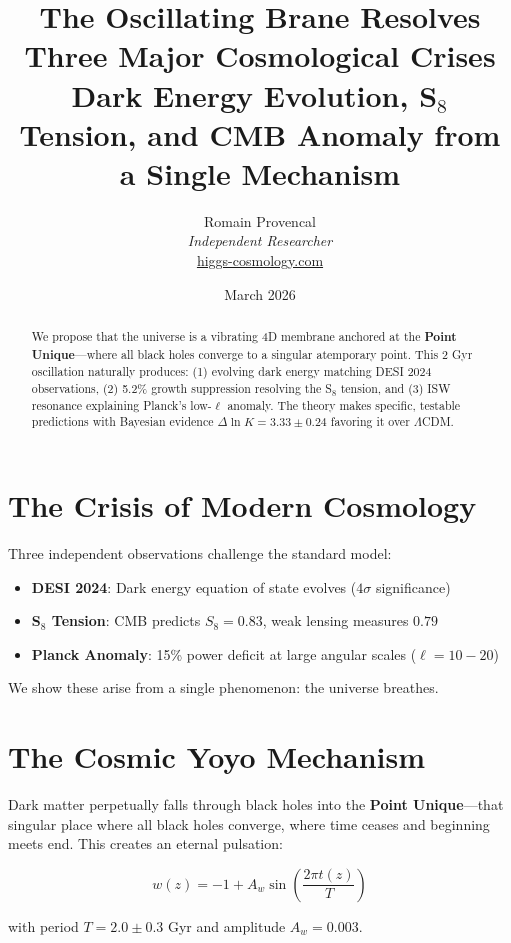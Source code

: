 \documentclass[11pt,a4paper]{article}
\title{\textbf{The Oscillating Brane Resolves Three Major Cosmological Crises}\\[0.5em]
\large{Dark Energy Evolution, S$_8$ Tension, and CMB Anomaly from a Single Mechanism}}
\author{Romain Provencal\\
\small{\textit{Independent Researcher}}\\
\small{\href{https://higgs-cosmology.com}{higgs-cosmology.com}}}
\date{March 2026}
\begin{document}
\maketitle

\begin{abstract}
\noindent
We propose that the universe is a vibrating 4D membrane anchored at the \textbf{Point Unique}—where all black holes converge to a singular atemporary point. This 2 Gyr oscillation naturally produces: (1) evolving dark energy matching DESI 2024 observations, (2) 5.2\% growth suppression resolving the S$_8$ tension, and (3) ISW resonance explaining Planck's low-$\ell$ anomaly. The theory makes specific, testable predictions with Bayesian evidence $\Delta\ln K = 3.33 \pm 0.24$ favoring it over $\Lambda$CDM.
\end{abstract}

\section*{The Crisis of Modern Cosmology}

Three independent observations challenge the standard model:
\begin{itemize}
\item \textbf{DESI 2024}: Dark energy equation of state evolves ($4\sigma$ significance)
\item \textbf{S$_8$ Tension}: CMB predicts $S_8 = 0.83$, weak lensing measures $0.79$
\item \textbf{Planck Anomaly}: 15\% power deficit at large angular scales ($\ell = 10-20$)
\end{itemize}

We show these arise from a single phenomenon: the universe breathes.

\section*{The Cosmic Yoyo Mechanism}

Dark matter perpetually falls through black holes into the \textbf{Point Unique}—that singular place where all black holes converge, where time ceases and beginning meets end. This creates an eternal pulsation:

\begin{equation}
w(z) = -1 + A_w \sin\left(\frac{2\pi t(z)}{T}\right)
\end{equation}

with period $T = 2.0 \pm 0.3$ Gyr and amplitude $A_w = 0.003$.
\end{document}
